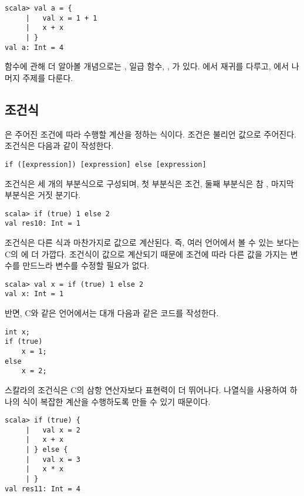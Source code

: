 \begin{verbatim}
scala> val a = {
     |   val x = 1 + 1
     |   x + x
     | }
val a: Int = 4
\end{verbatim}

함수에 관해 더 알아볼 개념으로는 , 일급 함수,
, 가
있다. 에서 재귀를 다루고, 에서 나머지 주제를
다룬다.

\subsection{조건식}

은 주어진 조건에 따라 수행할 계산을 정하는 식이다.
조건은 불리언 값으로 주어진다. 조건식은 다음과 같이 작성한다.

\begin{verbatim}
if ([expression]) [expression] else [expression]
\end{verbatim}

조건식은 세 개의 부분식으로 구성되며, 첫 부분식은 조건, 둘째 부분식은 참
, 마지막 부분식은 거짓 분기다.

\begin{verbatim}
scala> if (true) 1 else 2
val res10: Int = 1
\end{verbatim}

조건식은 다른 식과 마찬가지로 값으로 계산된다. 즉, 여러 언어에서 볼 수 있는
 보다는
C의  에 더 가깝다. 조건식이
값으로 계산되기 때문에 조건에 따라 다른 값을 가지는 변수를 만드느라 변수를
수정할 필요가 없다.

\begin{verbatim}
scala> val x = if (true) 1 else 2
val x: Int = 1
\end{verbatim}

반면, C와 같은 언어에서는 대개 다음과 같은 코드를 작성한다.

\begin{verbatim}
int x;
if (true)
    x = 1;
else
    x = 2;
\end{verbatim}

스칼라의 조건식은 C의 삼항 연산자보다 표현력이 더 뛰어나다. 나열식을 사용하여
하나의 식이 복잡한 계산을 수행하도록 만들 수 있기 때문이다.

\begin{verbatim}
scala> if (true) {
     |   val x = 2
     |   x + x
     | } else {
     |   val x = 3
     |   x * x
     | }
val res11: Int = 4
\end{verbatim}

